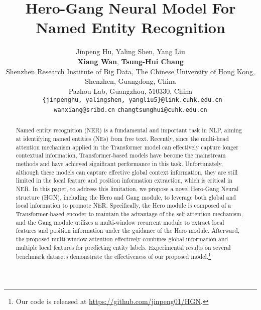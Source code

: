 \documentclass[11pt]{article}
\title{Hero-Gang Neural Model For Named Entity Recognition}
\author{Jinpeng Hu, \hspace{0.2cm}
Yaling Shen, \hspace{0.2cm}
Yang Liu \hspace{0.2cm} \\
 \textbf{Xiang Wan}, \hspace{0.2cm} \textbf{Tsung-Hui Chang} \\
Shenzhen Research Institute of Big Data, The Chinese University of Hong Kong, \\Shenzhen, Guangdong, China \hspace{0.2cm} \\
Pazhou Lab, Guangzhou, 510330, China \hspace{0.2cm} \\
\texttt{
\{jinpenghu, yalingshen, yangliu5\}@link.cuhk.edu.cn} \\
\texttt{wanxiang@sribd.cn} \hspace{0.2cm}
\texttt{changtsunghui@cuhk.edu.cn}
}
\begin{document}
\maketitle

\def\thefootnote{\dag}
\renewcommand{\thefootnote}{\arabic{footnote}}

\begin{abstract}
Named entity recognition (NER) is a fundamental and important task in NLP, aiming at identifying named entities (NEs) from free text. Recently, since the multi-head attention mechanism applied in the Transformer model can effectively capture longer contextual information, Transformer-based models have become the mainstream methods and have achieved significant performance in this task. Unfortunately, although these models can capture effective global context information, they are still limited in the local feature and position information extraction, which is critical in NER. In this paper, to address this limitation, we propose a novel Hero-Gang Neural structure (HGN), including the Hero and Gang module, to leverage both global and local information to promote NER. Specifically, the Hero module is composed of a Transformer-based encoder to maintain the advantage of the self-attention mechanism, and the Gang module utilizes a multi-window recurrent module to extract local features and position information under the guidance of the Hero module. Afterward, the proposed multi-window attention effectively combines global information and multiple local features for predicting entity labels. Experimental results on several benchmark datasets demonstrate the effectiveness of our proposed model.\footnote{Our code is released at \url{https://github.com/jinpeng01/HGN}.}
\end{abstract}
\end{document}
